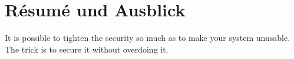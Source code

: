 \section{Résumé und Ausblick}
\kant[4-10]

\begin{quoting}
	\centering
	It is possible to tighten the security so much as to make your system unusable. The trick is to secure it without overdoing it.\cite{example}
\end{quoting}
